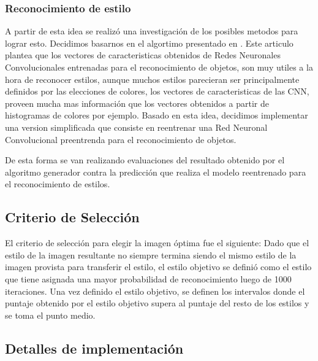 \documentclass[a4paper,11pt,spanish]{book}
\begin{document}
      \subsubsection{Reconocimiento de estilo}
	A partir de esta idea se realizó una investigación de los posibles metodos para lograr esto. Decidimos basarnos en el algortimo presentado en \cite{Karayev:Style_Recognition}.
	Este articulo plantea que los vectores de caracteristicas obtenidos de Redes Neuronales Convolucionales entrenadas para el reconocimiento de objetos, son muy utiles a la hora de
	reconocer estilos, aunque muchos estilos parecieran ser principalmente definidos por las elecciones de colores, los vectores de caracteristicas de las CNN, proveen mucha mas información
	que los vectores obtenidos a partir de histogramas de colores por ejemplo. 
	Basado en esta idea, decidimos implementar una version simplificada que consiste en reentrenar una Red Neuronal Convolucional preentrenda para el reconocimiento de objetos. 

	De esta forma se van realizando evaluaciones del resultado obtenido por el algoritmo generador contra la predicción que realiza el modelo reentrenado para el reconocimiento de estilos.
      
    \subsection{Criterio de Selección}
      El criterio de selección para elegir la imagen óptima fue el siguiente:
      Dado que el estilo de la imagen resultante no siempre termina siendo el mismo estilo de la imagen provista para transferir el estilo, el estilo objetivo se definió como el estilo
      que tiene asignada una mayor probabilidad de reconocimiento luego de 1000 iteraciones.
      Una vez definido el estilo objetivo, se definen los intervalos donde el puntaje obtenido por el estilo objetivo supera al puntaje del resto de los estilos y se toma el punto medio.

    \subsection{Detalles de implementación}
\end{document}
